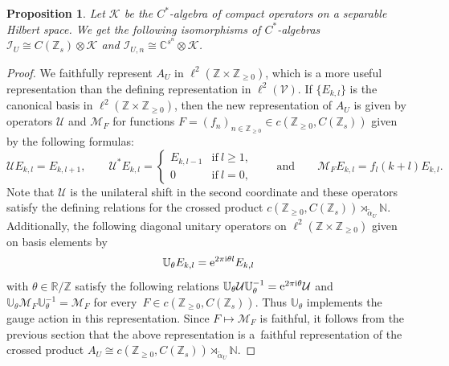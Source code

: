\documentclass[10pt,a4paper]{amsart}
\newcommand{\R}{{\mathbb R}}
\newcommand{\C}{{\mathbb C}}
\newcommand{\N}{{\mathbb N}}
\newcommand{\Z}{{\mathbb Z}}
\newcommand{\kcal}{{\mathcal K}}
\newcommand{\fancyI}{\mathcal{I}}
\numberwithin{equation}{section}
\newtheorem{Proposition}[Theorem]{Proposition}
 { \theoremstyle{definition}
\newtheorem{Definition}[Theorem]{Definition}
\newtheorem{Note}[Theorem]{Note}
\newtheorem{Example}[Theorem]{Example}
\newtheorem{Remark}[Theorem]{Remark} }
\begin{document}
\begin{Proposition}\label{IUStructure}
Let $\mathcal{K}$ be the $C^*$-algebra of compact operators on a separable Hilbert space.
We get the following isomorphisms of $C^*$-algebras
$
\mathcal{I}_U\cong C(\Z_s)\otimes\mathcal{K}
$
and
$
\fancyI_{U,n}\cong \C^{s^n}\otimes \kcal$.
\end{Proposition}
\begin{proof}
We faithfully represent $A_U$ in $\ell^2(\Z\times\Z_{\ge0})$, which is a more useful representation than the defining representation in $\ell^2(\mathcal{V})$.
If $\{E_{k,l}\}$ is the canonical basis in $\ell^2(\Z\times\Z_{\ge0})$, then the new representation of $A_U$ is given by operators $\mathcal{U}$ and $\mathcal{M}_F$ for functions $F=(f_n)_{n\in \Z_{\ge0}}\in c(\Z_{\ge0}, C(\Z_s))$ given by the following formulas:
\begin{equation*}
\mathcal{U}E_{k,l}=E_{k, l+1} ,\qquad \mathcal{U}^*E_{k,l} =
\begin{cases}
E_{k, l-1} &\textrm{if}\ l\ge1,\\
0 &\textrm{if}\ l=0,
\end{cases}\qquad\text{and}\qquad \mathcal{M}_FE_{k,l} = f_l(k+l)E_{k,l} .
\end{equation*}
Note that $\mathcal{U}$ is the unilateral shift in the second coordinate and these operators satisfy the defining relations for the crossed product $c(\Z_{\ge0}, C(\Z_s))\rtimes_{\tilde{\alpha}_U}\N$. Additionally, the following diagonal unitary operators on $\ell^2(\Z\times\Z_{\ge0})$ given on basis elements by
\begin{equation}\label{repgauge}
\mathbb{U}_\theta E_{k,l}={\rm e}^{2\pi {\rm i}\theta l}E_{k,l}
\end{equation}
with $\theta\in \R/\Z$ satisfy the following relations
$\mathbb{U}_\theta \mathcal{U} \mathbb{U}_\theta^{-1} = {\rm e}^{2\pi {\rm i}\theta}\mathcal{U}$ and $ \mathbb{U}_\theta \mathcal{M}_F \mathbb{U}_\theta^{-1} = \mathcal{M}_F
$
for every~${F\in c(\Z_{\ge0}, C(\Z_s))}$. Thus $\mathbb{U}_\theta$ implements the gauge action in this representation. Since $F\mapsto \mathcal{M}_F$ is faithful, it follows from the previous section that the above representation is a~faithful representation of the crossed product $A_U \cong c(\Z_{\ge0}, C(\Z_s))\rtimes_{\tilde{\alpha}_U}\N$.


\end{proof}
\end{document}
